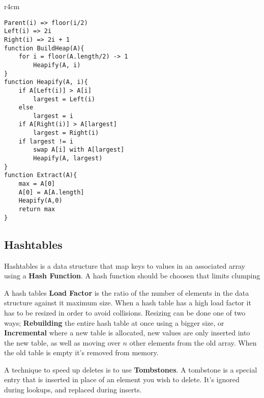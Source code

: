\documentclass{article}
\begin{document}
\begin{wrapfigure}{r}{4cm}
\end{wrapfigure}

\begin{lstlisting}[style=pseudo]
Parent(i) => floor(i/2)
Left(i) => 2i
Right(i) => 2i + 1
function BuildHeap(A){
	for i = floor(A.length/2) -> 1
		Heapify(A, i)
}
function Heapify(A, i){
	if A[Left(i)] > A[i]
		largest = Left(i)
	else
		largest = i
	if A[Right(i)] > A[largest]
		largest = Right(i)
	if largest != i
		swap A[i] with A[largest]
		Heapify(A, largest)
}
function Extract(A){
	max = A[0]
	A[0] = A[A.length]
	Heapify(A,0)
	return max
}
\end{lstlisting}



\subsection{Hashtables}
Hashtables is a data structure that map keys to values in an associated array using a {\bf Hash Function}. A hash function should be choosen that limits clumping

A hash tables {\bf Load Factor} is the ratio of the number of elements in the data structure against it maximum size. When a hash table has a high load factor it has to be resized in order to avoid collisions. Resizing can be done one of two ways; {\bf Rebuilding} the entire hash table at once using a bigger size, or {\bf Incremental} where a new table is allocated, new values are only inserted into the new table, as well as moving over $n$ other elements from the old array. When the old table is empty it's removed from memory.

A technique to speed up deletes is to use {\bf Tombstones}. A tombstone is a special entry that is inserted in place of an element you wish to delete. It's ignored during lookups, and replaced during inserts.
\end{document}

